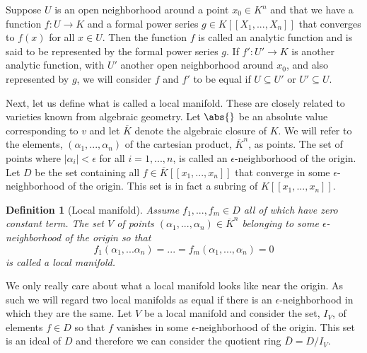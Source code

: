 \documentclass{article}
\newtheorem{definition}{Definition}[section]
\begin{document}
Suppose $U$ is an open neighborhood around a point $x_0 \in K^n$ and that we have a function $f : U \to K$ and a formal power series $g \in K[[X_1, ..., X_n]]$ that converges to $f(x)$ for all $x \in U$. Then the function $f$ is called an analytic function and is said to be represented by the formal power series $g$. If $f' : U' \to K$ is another analytic function, with $U'$ another open neighborhood around $x_0$, and also represented by $g$, we will consider $f$ and $f'$ to be equal if $U \subseteq U'$ or $U' \subseteq U$.


Next, let us define what is called a local manifold. These are closely related to varieties known from algebraic geometry. Let $\abs{}$ be an absolute value corresponding to $v$ and let $\overline K$ denote the algebraic closure of $K$. We will refer to the elements, $(\alpha_1, ..., \alpha_n)$ of the cartesian product, $\overline K^n$, as points. The set of points where $|\alpha_i| < \epsilon$ for all $i = 1, ..., n$, is called an $\epsilon$-neighborhood of the origin.  Let $D$ be the set containing all $f \in \overline K[[x_1, ..., x_n]]$ that converge in some $\epsilon$-neighborhood of the origin. This set is in fact a subring of $K[[x_1, ..., x_n]]$.

\begin{definition}[Local manifold]
    Assume $f_1, ..., f_m \in D$ all of which have zero constant term. The set $V$ of points $(\alpha_1, ..., \alpha_n) \in \overline {K}^n$ belonging to some $\epsilon$-neighborhood of the origin so that $$f_1(\alpha_1, ... \alpha_n) = ... = f_m(\alpha_1, ..., \alpha_n) = 0$$
    is called a local manifold. 
\end{definition}
We only really care about what a local manifold looks like near the origin. As such we will regard two local manifolds as equal if there is an $\epsilon$-neighborhood in which they are the same. Let $V$ be a local manifold and consider the set, $I_V$, of elements $f \in D$ so that $f$ vanishes in some $\epsilon$-neighborhood of the origin. This set is an ideal of $D$ and therefore we can consider the quotient ring $\overline D = D / I_V$.
\end{document}
